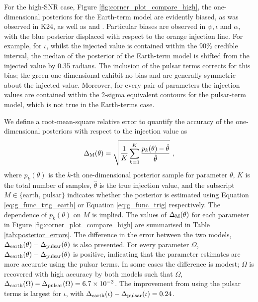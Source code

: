 \documentclass[fleqn,usenatbib,useAMS]{mnras}
\begin{document}
For the high-SNR case, Figure \ref{fig:corner_plot_compare_high}, the one-dimensional posteriors for the Earth-term model are evidently biased, as was observed in K24, as well as \cite{Zhupulsarterms} and \cite{Chen2022}. Particular biases are observed in $\psi, \iota $ and $\alpha$, with the blue posterior displaced with respect to the orange injection line. For example, for $\iota$, whilst the injected value is contained within the 90\% credible interval, the median of the posterior of the Earth-term model is shifted from the injected value by 0.35 radians. The inclusion of the pulsar terms corrects for this bias; the green one-dimensional exhibit no bias and are generally symmetric about the injected value. Moreover, for every pair of parameters the injection values are contained within the 2-sigma equivalent contours for the pulsar-term model, which is not true in the Earth-terms case. \newline 


We define a root-mean-square relative error to quantify the accuracy of the one-dimensional posteriors with respect to the injection value as
\begin{equation}
\Delta_{\rm M}(\theta) = \sqrt{\frac{1}{K}\sum_{k=1}^{K} \frac{p_k(\theta) - \hat{\theta}}{\hat{\theta}}} \ , \label{eq:mean_rel_error}
\end{equation}
where $p_k(\theta)$ is the $k$-th one-dimensional posterior sample for parameter $\theta$, $K$ is the total number of samples, $\hat{\theta}$ is the true injection value, and the subscript $M \in \{ \text{earth, pulsar} \}$ indicates whether the posterior is estimated using Equation \eqref{eq:g_func_trig_earth} or Equation \eqref{eq:g_func_trig} respectively. The dependence of $p_k(\theta)$ on $M$ is implied. The values of $\Delta_{\rm M}(\theta)$ for each parameter in Figure \ref{fig:corner_plot_compare_high} are summarised in Table \ref{tab:posterior_errors}. The difference in the error between the two models, $\Delta_{\rm earth}(\theta)-\Delta_{\rm pulsar}(\theta)$ is also presented. For every parameter $\Omega$, $\Delta_{\rm earth}(\theta)-\Delta_{\rm pulsar}(\theta)$ is positive, indicating that the parameter estimates are more accurate using the pulsar terms. In some cases the difference is modest;  $\Omega$ is recovered with high accuracy by both models such that $\Omega$, $\Delta_{\rm earth}(\Omega)-\Delta_{\rm pulsar}(\Omega) = 6.7 \times 10^{-3}$. The improvement from using the pulsar terms is largest for $\iota$, with $\Delta_{\rm earth}(\iota) - \Delta_{\rm pulsar}(\iota)  = 0.24$. \newline 
		
\end{document}
